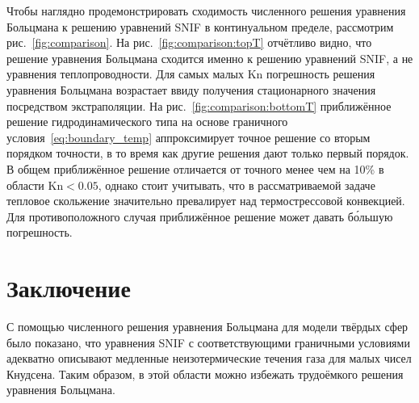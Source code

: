 \documentclass[10pt]{article}
\newcommand{\Kn}{\mathrm{Kn}}
\begin{document}
Чтобы наглядно продемонстрировать сходимость численного решения уравнения Больцмана к
решению уравнений SNIF в континуальном пределе, рассмотрим рис.~\ref{fig:comparison}.
На рис.~\ref{fig:comparison:topT} отчётливо видно, что решение уравнения Больцмана сходится
именно к решению уравнений SNIF, а не уравнения теплопроводности.
Для самых малых \(\Kn\) погрешность решения уравнения Больцмана возрастает
ввиду получения стационарного значения посредством экстраполяции.
На рис.~\ref{fig:comparison:bottomT} приближённое решение гидродинамического типа
на основе граничного условия~\eqref{eq:boundary_temp} аппроксимирует
точное решение со вторым порядком точности,
в то время как другие решения дают только первый порядок.
В общем приближённое решение отличается от точного менее чем на 10\% в области \(\Kn<0.05\),
однако стоит учитывать, что в рассматриваемой задаче тепловое скольжение значительно превалирует
над термострессовой конвекцией. Для противоположного случая приближённое решение может давать
б\'{о}льшую погрешность.

\section{Заключение}

С помощью численного решения уравнения Больцмана для модели твёрдых сфер было показано,
что уравнения SNIF с соответствующими граничными условиями адекватно описывают
медленные неизотермические течения газа для малых чисел Кнудсена.
Таким образом, в этой области можно избежать трудоёмкого решения уравнения Больцмана.

\printbibliography
\end{document}

